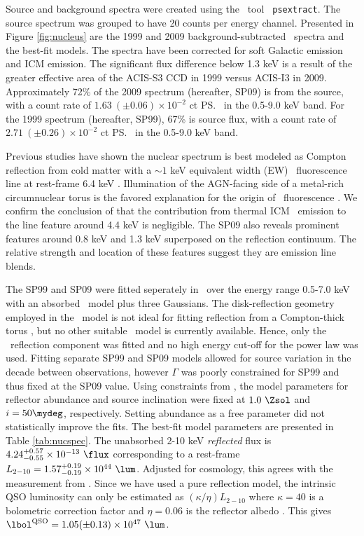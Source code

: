 \documentclass[useAMS,usenatbib]{mn2e}
\begin{document}
Source and background spectra were created using the \ciao\ tool {\tt
  psextract}. The source spectrum was grouped to have 20 counts per
energy channel. Presented in Figure \ref{fig:nucleus} are the 1999 and
2009 background-subtracted \chandra\ spectra and the best-fit
models. The spectra have been corrected for soft Galactic emission and
ICM emission. The significant flux difference below 1.3 keV is a
result of the greater effective area of the ACIS-S3 CCD in 1999 versus
ACIS-I3 in 2009. Approximately 72\% of the 2009 spectrum (hereafter,
SP09) is from the source, with a count rate of $1.63 ~(\pm 0.06)
\times 10^{-2}$ ct \ps\ in the 0.5-9.0 keV band. For the 1999 spectrum
(hereafter, SP99), 67\% is source flux, with a count rate of $2.71
~(\pm 0.26) \times 10^{-2}$ ct \ps\ in the 0.5-9.0 keV band.

Previous studies have shown the nuclear spectrum is best modeled as
Compton reflection from cold matter with a $\sim 1$ keV equivalent
width (EW) \feka\ fluorescence line at rest-frame 6.4 keV
\citep{2000AJ....120..562T, 2001MNRAS.321L..15I}. Illumination of the
AGN-facing side of a metal-rich circumnuclear torus is the favored
explanation for the origin of \feka\ fluorescence
\citep{1994ApJ...420L..57K}. We confirm the conclusion of
\citet{2001MNRAS.321L..15I} that the contribution from thermal ICM
\feka\ emission to the line feature around 4.4 keV is negligible. The
SP09 also reveals prominent features around 0.8 keV and 1.3 keV
superposed on the reflection continuum. The relative strength and
location of these features suggest they are emission line blends.

The SP99 and SP09 were fitted seperately in \xspec\ over the energy
range 0.5-7.0 keV with an absorbed \pexrav\ model \citep{pexrav} plus
three Gaussians. The disk-reflection geometry employed in the
\pexrav\ model is not ideal for fitting reflection from a
Compton-thick torus \citep{2009MNRAS.397.1549M}, but no other suitable
\xspec\ model is currently available. Hence, only the
\pexrav\ reflection component was fitted and no high energy cut-off
for the power law was used. Fitting separate SP99 and SP09 models
allowed for source variation in the decade between observations,
however $\Gamma$ was poorly constrained for SP99 and thus fixed at the
SP09 value. Using constraints from \citet{2000AJ....120..562T}, the
model parameters for reflector abundance and source inclination were
fixed at $1.0 ~\Zsol$ and $i = 50\mydeg$, respectively. Setting
abundance as a free parameter did not statistically improve the
fits. The best-fit model parameters are presented in Table
\ref{tab:nucspec}. The unabsorbed 2-10 keV {\it{reflected}} flux is
$4.24^{+0.57}_{-0.55} \times 10^{-13} ~\flux$ corresponding to a
rest-frame $L_{2-10} = 1.57^{+0.19}_{-0.19} \times 10^{44}
~\lum$. Adjusted for cosmology, this agrees with the measurement from
\citet{2001MNRAS.321L..15I}. Since we have used a pure reflection
model, the intrinsic QSO luminosity can only be estimated as
$(\kappa/\eta) L_{2-10}$ where $\kappa = 40$ is a bolometric
correction factor \citep{2007MNRAS.381.1235V} and $\eta = 0.06$ is the
reflector albedo \citep{2009MNRAS.397.1549M}. This gives $\lqso = 1.05
(\pm 0.13) \times 10^{47} ~\lum$.
\end{document}
